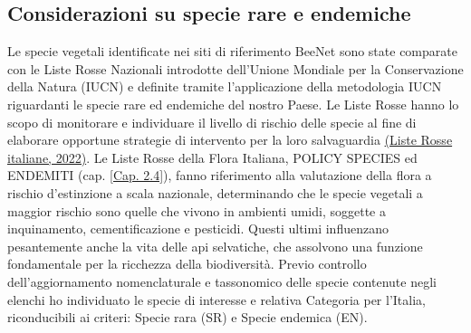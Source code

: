 \documentclass[main.tex]{subfiles}
\begin{document}
\subsection{Considerazioni su specie rare e endemiche}

Le specie vegetali identificate nei siti di riferimento BeeNet sono state comparate con le Liste Rosse Nazionali introdotte dell’Unione Mondiale per la Conservazione della Natura (IUCN) e definite tramite l’applicazione della metodologia IUCN riguardanti le specie rare ed endemiche del nostro Paese.
Le Liste Rosse hanno lo scopo di monitorare e individuare il livello di rischio delle specie al fine di elaborare opportune strategie di intervento per la loro salvaguardia \href{http://www.iucn.it/liste-rosse-italiane.php}{(Liste Rosse italiane, 2022)}.
Le Liste Rosse della Flora Italiana, POLICY SPECIES ed ENDEMITI (cap. \ref{Cap. 2.4}), fanno riferimento alla valutazione della flora a rischio d’estinzione a scala nazionale, determinando che le specie vegetali a maggior rischio sono quelle che vivono in ambienti umidi, soggette a inquinamento, cementificazione e pesticidi. Questi ultimi influenzano pesantemente anche la vita delle api selvatiche, che assolvono una funzione fondamentale per la ricchezza della biodiversità.
Previo controllo dell’aggiornamento nomenclaturale e tassonomico delle specie contenute negli elenchi ho individuato le specie di interesse e relativa Categoria per l’Italia, riconducibili ai criteri: Specie rara (SR) e Specie endemica (EN).
\end{document}
